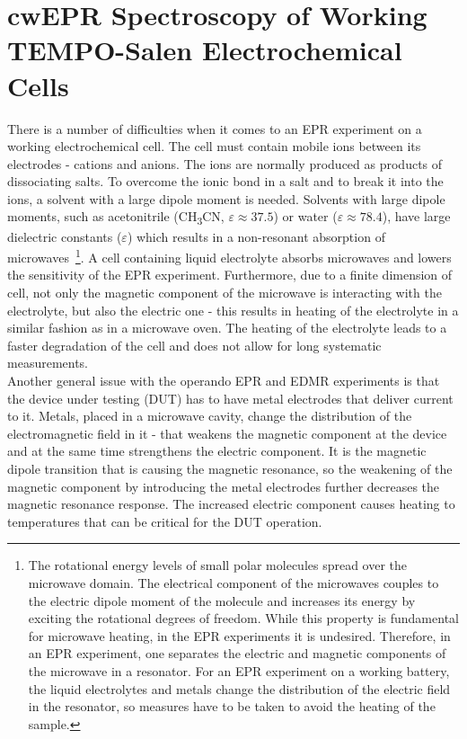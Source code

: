 \section{cwEPR Spectroscopy of Working\\TEMPO-Salen Electrochemical Cells}
There is a number of difficulties when it comes to an EPR experiment on a working electrochemical cell. The cell must contain mobile ions between its electrodes - cations and anions. The ions are normally produced as products of dissociating salts. To overcome the ionic bond in a salt and to break it into the ions, a solvent with a large dipole moment is needed. Solvents with large dipole moments, such as acetonitrile (CH\textsubscript{3}CN, $\varepsilon\approx 37.5$) or water ($\varepsilon\approx78.4$), have large dielectric constants ($\varepsilon$) which results in a non-resonant absorption of microwaves~\footnote{The rotational energy levels of small polar molecules spread over the microwave domain. The electrical component of the microwaves couples to the electric dipole moment of the molecule and increases its energy by exciting the rotational degrees of freedom. While this property is fundamental for microwave heating, in the EPR experiments it is undesired. Therefore, in an EPR experiment, one separates the electric and magnetic components of the microwave in a resonator. For an EPR experiment on a working battery, the liquid electrolytes and metals change the distribution of the electric field in the resonator, so measures have to be taken to avoid the heating of the sample.}. A cell containing liquid electrolyte absorbs microwaves and lowers the sensitivity of the EPR experiment. Furthermore, due to a finite dimension of cell, not only the magnetic component of the microwave is interacting with the electrolyte, but also the electric one - this results in heating of the electrolyte in a similar fashion as in a microwave oven. The heating of the electrolyte leads to a faster degradation of the cell and does not allow for long systematic measurements.\\
Another general issue with the operando EPR and EDMR experiments is that the device under testing (DUT) has to have metal electrodes that deliver current to it. Metals, placed in a microwave cavity, change the distribution of the electromagnetic field in it - that weakens the magnetic component at the device and at the same time strengthens the electric component. It is the magnetic dipole transition that is causing the magnetic resonance, so the weakening of the magnetic component by introducing the metal electrodes further decreases the magnetic resonance response. The increased electric component causes heating to temperatures that can be critical for the DUT operation.

